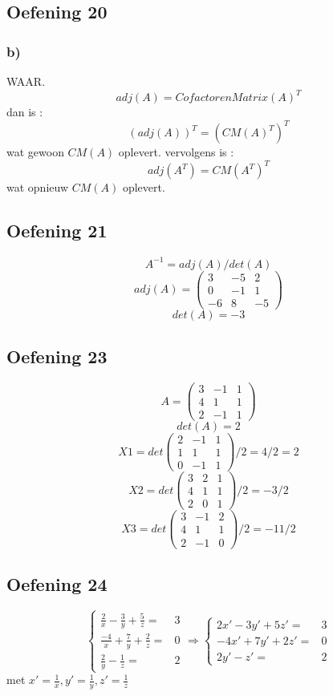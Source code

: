 \documentclass[lineaire_algebra_oplossingen.tex]{subfiles}
\begin{document}
\subsection{Oefening 20}
\subsubsection*{b)}

WAAR.
\[
adj(A) = CofactorenMatrix(A)^T
\]
dan is : 
\[
(adj(A))^T = (CM(A)^T)^T
\]
wat gewoon $CM(A)$ oplevert.
vervolgens is : 
\[
adj(A^T) = CM(A^T)^T
\]
wat opnieuw $CM(A)$ oplevert.


\subsection{Oefening 21}
\[A^{-1} = adj(A)/det(A)\]
\[adj(A) =
\begin{pmatrix}
3 & -5 & 2\\
0 & -1 & 1\\
-6 & 8 & -5
\end{pmatrix} 
\]
\[det(A)=-3\]

\subsection{Oefening 23}
\[ A = 
\begin{pmatrix}
3 & -1 & 1\\
4 & 1 & 1\\
2 & -1 & 1
\end{pmatrix}
\]
\[ det(A) = 2\]
\[X1 = det 
\begin{pmatrix}
2 & -1 & 1\\
1 & 1 & 1\\
0 & -1 & 1
\end{pmatrix}
/2 = 4/2 = 2 \]
\[X2 = det
\begin{pmatrix}
3 & 2 & 1\\
4 & 1 & 1\\
2 & 0 & 1
\end{pmatrix}
/2 = -3/2 \]
\[X3 = det
\begin{pmatrix}
3 & -1 & 2\\
4 & 1 & 1\\
2 & -1 & 0
\end{pmatrix}
/2 = -11/2 \]

\subsection{Oefening 24}
\[ \left\{
     \begin{array}{lr}
       \frac{2}{x}-\frac{3}{y}+\frac{5}{z} = & 3 \\
       \frac{-4}{x}+\frac{7}{y}+\frac{2}{z} = & 0 \\
       \frac{2}{y}-\frac{1}{z} = & 2
     \end{array}
   \right. \Rightarrow\left\{
     \begin{array}{lr}
       2x'-3y'+5z' = & 3 \\
       -4x'+7y'+2z' = & 0 \\
       2y'-z' = & 2
     \end{array}
   \right.
\]
met $x' = \frac{1}{x}, y' = \frac{1}{y}, z' = \frac{1}{z}$
\end{document}
